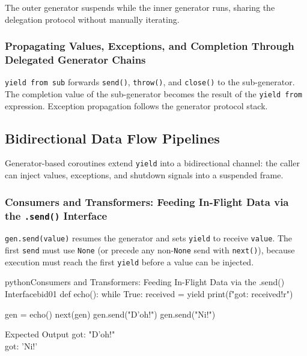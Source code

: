 \documentclass[a4paper,twoside]{report}
\begin{document}
The outer generator suspends while the inner generator runs, sharing the delegation protocol without manually iterating.

\subsubsection{Propagating Values, Exceptions, and Completion Through Delegated Generator Chains}

\texttt{yield from sub} forwards \texttt{send()}, \texttt{throw()}, and \texttt{close()} to the sub-generator. The completion value of the sub-generator becomes the result of the \texttt{yield from} expression. Exception propagation follows the generator protocol stack.


\subsection{Bidirectional Data Flow Pipelines}

Generator-based coroutines extend \texttt{yield} into a bidirectional channel: the caller can inject values, exceptions, and shutdown signals into a suspended frame.

\subsubsection{Consumers and Transformers: Feeding In-Flight Data via the \texttt{.send()} Interface}

\texttt{gen.send(value)} resumes the generator and sets \texttt{yield} to receive \texttt{value}. The first \texttt{send} must use \texttt{None} (or precede any non-\texttt{None} send with \texttt{next()}), because execution must reach the first \texttt{yield} before a value can be injected.

\begin{codebox}[]{python}{Consumers and Transformers: Feeding In-Flight Data via the .send() Interface}{bid01}
def echo():
    while True:
        received = yield
        print(f"got: {received!r}")

gen = echo()
next(gen)
gen.send("D'oh!")
gen.send("Ni!")
\end{codebox}


\begin{iobox}{Expected Output}
got: "D'oh!" \\
got: 'Ni!' \\
\end{iobox}
\end{document}
